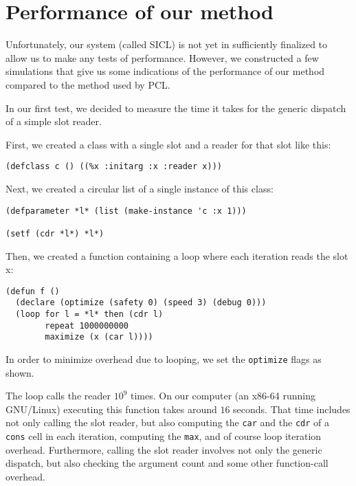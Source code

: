 \section{Performance of our method}

Unfortunately, our system (called SICL) is not yet in sufficiently
finalized to allow us to make any tests of performance.  However, we
constructed a few simulations that give us some indications of the
performance of our method compared to the method used by PCL.

In our first test, we decided to measure the time it takes for the
generic dispatch of a simple slot reader. 

First, we created a class with a single slot and a reader for that
slot like this:

\begin{verbatim}
(defclass c () ((%x :initarg :x :reader x)))  
\end{verbatim}

Next, we created a circular list of a single instance of this class:

\begin{verbatim}
(defparameter *l* (list (make-instance 'c :x 1)))

(setf (cdr *l*) *l*)
\end{verbatim}

Then, we created a function containing a loop where each iteration
reads the slot x:

\begin{verbatim}
(defun f ()
  (declare (optimize (safety 0) (speed 3) (debug 0)))
  (loop for l = *l* then (cdr l)
        repeat 1000000000
        maximize (x (car l))))
\end{verbatim}

In order to minimize overhead due to looping, we set the
\texttt{optimize} flags as shown. 

The loop calls the reader $10^9$ times.  On our computer (an x86-64
running GNU/Linux) executing this function takes around $16$ seconds.
That time includes not only calling the slot reader, but also
computing the \texttt{car} and the \texttt{cdr} of a \texttt{cons}
cell in each iteration, computing the \texttt{max}, and of course loop
iteration overhead.  Furthermore, calling the slot reader involves not
only the generic dispatch, but also checking the argument count and
some other function-call overhead.

